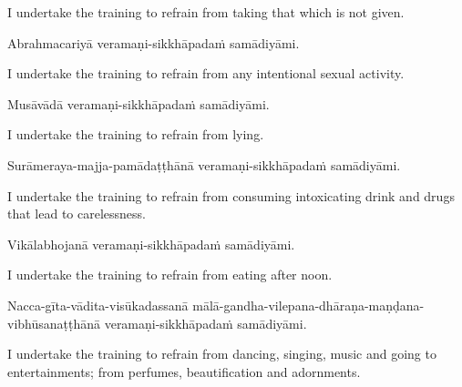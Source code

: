 \begin{english-hang}
  I undertake the training to refrain from taking that which is not given.
\end{english-hang}

Abrahmacariyā veramaṇi-sikkhāpadaṁ samādiyāmi.

\begin{english-hang}
  I undertake the training to refrain from any intentional sexual activity.
\end{english-hang}

Musāvādā veramaṇi-sikkhāpadaṁ samādiyāmi.

\begin{english}
  I undertake the training to refrain from lying.
\end{english}

\begin{pali-hang}
  Surāmeraya-majja-pamādaṭṭhānā veramaṇi-sikkhāpadaṁ samādiyāmi.
\end{pali-hang}

\begin{english-hang}
  I undertake the training to refrain from consuming intoxicating drink and drugs that\hyperlink{endnote138-appendix}{\hypertarget{endnote138-body}{}}
  lead to carelessness.
\end{english-hang}

Vikālabhojanā veramaṇi-sikkhāpadaṁ samādiyāmi.

\begin{english}
  I undertake the training to refrain from eating after noon.\hyperlink{endnote139-appendix}{\hypertarget{endnote139-body}{}}
\end{english}

\begin{pali-hang}
  Nacca-gīta-vādita-visūkadassanā mālā-gandha-vilepana-dhāraṇa-maṇḍana-vibhūsanaṭṭhānā veramaṇi-sikkhāpadaṁ samādiyāmi.
\end{pali-hang}

\begin{english-hang}
  I undertake the training to refrain from dancing, singing, music and going to entertainments; from perfumes, beautification and adornments.\hyperlink{endnote140-appendix}{\hypertarget{endnote140-body}{}}
\end{english-hang}

